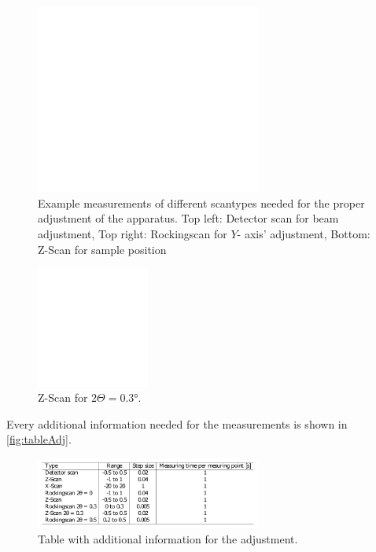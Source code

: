 \begin{figure}
	\centering
	\includegraphics[width=0.66\textwidth]{content/graphics/AdjustmentPlots.pdf}
	\caption{Example measurements of different scantypes needed for the proper adjustment of the apparatus. Top left: Detector scan for beam adjustment, Top right: Rockingscan for $Y$- axis' adjustment, Bottom: Z-Scan for sample position }
	\label{fig:Adjustplot}
\end{figure}

\begin{figure}
	\centering
	\includegraphics[width=0.33\textwidth]{content/graphics/zscan.pdf}
	\caption{Z-Scan for $2\Theta = 0.3°$.}
	\label{fig:zscan}
\end{figure}

Every additional information needed for the measurements is shown in \autoref{fig:tableAdj}.
\begin{figure}
	\centering
	\includegraphics[width=0.66\textwidth]{content/graphics/table.pdf}
	\caption{Table with additional information for the adjustment.}
	\label{fig:tableAdj}
\end{figure}

